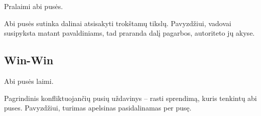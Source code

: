 Pralaimi abi pusės.

Abi pusės sutinka dalinai atsisakyti trokštamų tikslų. Pavyzdžiui, vadovai
susipyksta matant pavaldiniams, tad praranda dalį pagarbos, autoriteto
jų akyse.

\subsection{Win-Win}

Abi pusės laimi.

Pagrindinis konfliktuojančių pusių uždavinys – rasti sprendimą, kuris
tenkintų abi puses. Pavyzdžiui, turimas apelsinas pasidalinamas
per pusę.

